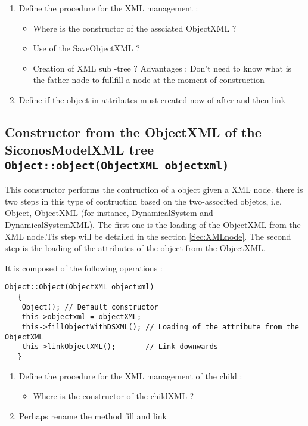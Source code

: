  \begin{ndr}
   \begin{enumerate}
   \item Define the procedure for the XML management :
     \begin{itemize}
     \item  Where  is the constructor of the assciated ObjectXML ? 
     \item  Use of the SaveObjectXML ?
     \item  Creation of XML sub -tree ? Advantages : Don't need to know what is the father node to fullfill a node at the moment of construction
     \end{itemize}
   \item Define if the object in attributes must created now of after and then link
   \end{enumerate}
 \end{ndr}


\subsection{Constructor from the ObjectXML of the SiconosModelXML tree {\small \tt Object::object(ObjectXML objectxml) }}

This constructor performs  the contruction of a object given a XML node. there is two steps in this type of contruction  based on the two-associted objetcs, i.e, Object, ObjectXML (for instance, DynamicalSystem and DynamicalSystemXML). The first one is the loading of the ObjectXML from the XML node.Tis step will be detailed in the section \ref{Sec:XMLnode}. The second  step is the loading of the attributes of the object from the ObjectXML.


 It is composed of the following operations :

\begin{verbatim}
Object::Object(ObjectXML objectxml)
   {
    Object(); // Default constructor
    this->objectxml = objectXML;        
    this->fillObjectWithDSXML(); // Loading of the attribute from the ObjectXML
    this->linkObjectXML();       // Link downwards
   }
\end{verbatim} 



 \begin{ndr}
   \begin{enumerate}
   \item Define the procedure for the XML management of the child :
     \begin{itemize}
     \item  Where  is the constructor of the childXML ?
     \end{itemize}
   \item Perhaps rename the method fill and link
   \end{enumerate}
 \end{ndr}



\clearpage